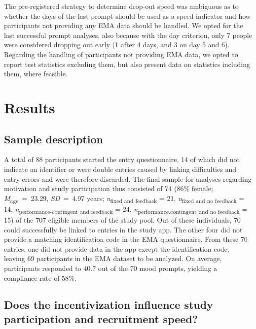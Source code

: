 \documentclass[authordate, empirical]{jote-new-article}
\begin{document}
	The pre-registered strategy to determine drop-out speed was ambiguous as to whether the days of the last prompt should be used as a speed indicator and how participants not providing any EMA data should be handled. We opted for the last successful prompt analyses, also because with the day criterion, only 7 people were considered dropping out early (1 after 4 days, and 3 on day 5 and 6). Regarding the handling of participants not providing EMA data, we opted to report test statistics excluding them, but also present data on statistics including them, where feasible.



	\section{Results}



	\subsection{Sample description}



	A total of 88 participants started the entry questionnaire, 14 of which did not indicate an identifier or were double entries caused by linking difficulties and entry errors and were therefore discarded. The final sample for analyses regarding motivation and study participation thus consisted of 74 (86\% female; \emph{M}\textsubscript{age}\emph{ }= 23.29, \emph{SD }= 4.97 years; \emph{n}\textsubscript{fixed and feedback }= 21, \emph{n}\textsubscript{fixed and no feedback }= 14, \emph{n}\textsubscript{performance-contingent and feedback }= 24, \emph{n}\textsubscript{performance.contingent}\textsubscript{ and no feedback }= 15) of the 707 eligible members of the study pool. Out of these individuals, 70 could successfully be linked to entries in the study app. The other four did not provide a matching identification code in the EMA questionnaire. From these 70 entries, one did not provide data in the app except the identification code, leaving 69 participants in the EMA dataset to be analyzed. On average, participants responded to 40.7 out of the 70 mood prompts, yielding a compliance rate of 58\%.



	\subsection{Does the incentivization influence study participation and recruitment speed?}
\end{document}
